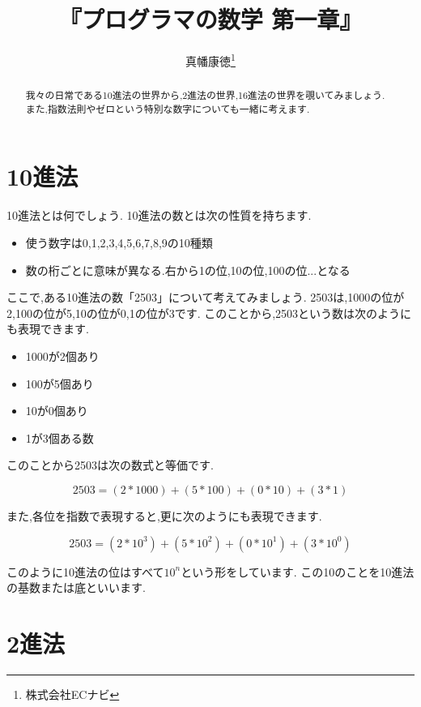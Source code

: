 \documentclass[10pt, twocolumn]{jarticle}
\title{『プログラマの数学 第一章』}
\author{真幡康徳\thanks{株式会社ECナビ}}
\begin{document}
\maketitle
\begin{abstract}
我々の日常である10進法の世界から,2進法の世界,16進法の世界を覗いてみましょう.
また,指数法則やゼロという特別な数字についても一緒に考えます.
\end{abstract}

\section{10進法}

10進法とは何でしょう.
10進法の数とは次の性質を持ちます.

\begin{itemize}
  \item 使う数字は0,1,2,3,4,5,6,7,8,9の10種類
  \item 数の桁ごとに意味が異なる.右から1の位,10の位,100の位...となる
\end{itemize}

ここで,ある10進法の数「2503」について考えてみましょう.
2503は,1000の位が2,100の位が5,10の位が0,1の位が3です.
このことから,2503という数は次のようにも表現できます.

\begin{itemize}
  \item 1000が2個あり
  \item 100が5個あり
  \item 10が0個あり
  \item 1が3個ある数
\end{itemize}

このことから2503は次の数式と等価です.

\begin{displaymath}2503 = (2 * 1000) + (5 * 100) + (0 * 10) + (3 * 1)\end{displaymath}

また,各位を指数で表現すると,更に次のようにも表現できます.

\begin{displaymath}
2503 = (2 * 10^3) + (5 * 10^2) + (0 * 10^1) + (3 * 10^0)
\end{displaymath}

このように10進法の位はすべて$10^n$という形をしています.
この10のことを10進法の基数または底といいます.

\section{2進法}
\end{document}
